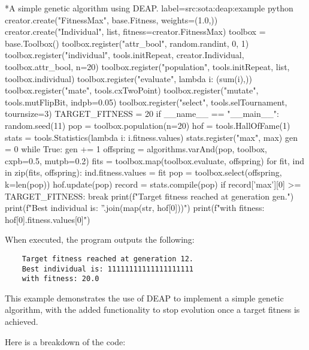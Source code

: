   \begin{code}*{A simple genetic algorithm using DEAP.}{
    label={src:sota:deap:example}
  }{python}
    creator.create("FitnessMax", base.Fitness, weights=(1.0,))
    creator.create("Individual", list, fitness=creator.FitnessMax)
    toolbox = base.Toolbox()
    toolbox.register("attr_bool", random.randint, 0, 1)
    toolbox.register("individual", tools.initRepeat, creator.Individual, toolbox.attr_bool, n=20)
    toolbox.register("population", tools.initRepeat, list, toolbox.individual)
    toolbox.register("evaluate", lambda i: (sum(i),))
    toolbox.register("mate", tools.cxTwoPoint)
    toolbox.register("mutate", tools.mutFlipBit, indpb=0.05)
    toolbox.register("select", tools.selTournament, tournsize=3)
    TARGET_FITNESS = 20
    if __name__ == "__main__":
        random.seed(11)
        pop = toolbox.population(n=20)
        hof = tools.HallOfFame(1)
        stats = tools.Statistics(lambda i: i.fitness.values)
        stats.register("max", max)
        gen = 0
        while True:
            gen += 1
            offspring = algorithms.varAnd(pop, toolbox, cxpb=0.5, mutpb=0.2)
            fits = toolbox.map(toolbox.evaluate, offspring)
            for fit, ind in zip(fits, offspring):
                ind.fitness.values = fit
            pop = toolbox.select(offspring, k=len(pop))
            hof.update(pop)
            record = stats.compile(pop)
            if record['max'][0] >= TARGET_FITNESS:
                break
        print(f"Target fitness reached at generation {gen}.")
        print(f"Best individual is: {''.join(map(str, hof[0]))}")
        print(f"with fitness: {hof[0].fitness.values[0]}")
  \end{code}

  When executed, the program outputs the following:

  \begin{verbatim}
    Target fitness reached at generation 12.
    Best individual is: 11111111111111111111
    with fitness: 20.0
  \end{verbatim}

  This example demonstrates the use of DEAP to implement a simple genetic
  algorithm, with the added functionality to stop evolution once a target
  fitness is achieved.

  Here is a breakdown of the code:

